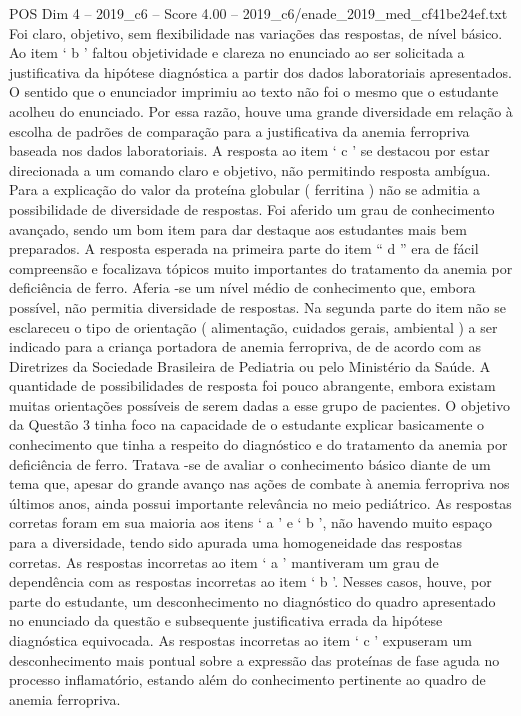 \begin{textsample}{POS Dim 4 – 2019\_c6 – Score 4.00 – 2019\_c6/enade\_2019\_med\_cf41be24ef.txt}
Foi claro, objetivo, sem flexibilidade nas variações das respostas, de nível básico.
Ao item ‘ b ’ faltou objetividade e clareza no enunciado ao ser solicitada a justificativa da hipótese diagnóstica a partir dos dados laboratoriais apresentados.
O sentido que o enunciador imprimiu ao texto não foi o mesmo que o estudante acolheu do enunciado.
Por essa razão, houve uma grande diversidade em relação à escolha de padrões de comparação para a justificativa da anemia ferropriva baseada nos dados laboratoriais.
A resposta ao item ‘ c ’ se destacou por estar direcionada a um comando claro e objetivo, não permitindo resposta ambígua.
Para a explicação do valor da proteína globular ( ferritina ) não se admitia a possibilidade de diversidade de respostas.
Foi aferido um grau de conhecimento avançado, sendo um bom item para dar destaque aos estudantes mais bem preparados.
A resposta esperada na primeira parte do item “ d ” era de fácil compreensão e focalizava tópicos muito importantes do tratamento da anemia por deficiência de ferro.
Aferia -se um nível médio de conhecimento que, embora possível, não permitia diversidade de respostas.
Na segunda parte do item não se esclareceu o tipo de orientação ( alimentação, cuidados gerais, ambiental ) a ser indicado para a criança portadora de anemia ferropriva, de de acordo com as Diretrizes da Sociedade Brasileira de Pediatria ou pelo Ministério da Saúde.
A quantidade de possibilidades de resposta foi pouco abrangente, embora existam muitas orientações possíveis de serem dadas a esse grupo de pacientes.
O objetivo da Questão 3 tinha foco na capacidade de o estudante explicar basicamente o conhecimento que tinha a respeito do diagnóstico e do tratamento da anemia por deficiência de ferro.
Tratava -se de avaliar o conhecimento básico diante de um tema que, apesar do grande avanço nas ações de combate à anemia ferropriva nos últimos anos, ainda possui importante relevância no meio pediátrico.
As respostas corretas foram em sua maioria aos itens ‘ a ’ e ‘ b ’, não havendo muito espaço para a diversidade, tendo sido apurada uma homogeneidade das respostas corretas.
As respostas incorretas ao item ‘ a ’ mantiveram um grau de dependência com as respostas incorretas ao item ‘ b ’.
Nesses casos, houve, por parte do estudante, um desconhecimento no diagnóstico do quadro apresentado no enunciado da questão e subsequente justificativa errada da hipótese diagnóstica equivocada.
As respostas incorretas ao item ‘ c ’ expuseram um desconhecimento mais pontual sobre a expressão das proteínas de fase aguda no processo inflamatório, estando além do conhecimento pertinente ao quadro de anemia ferropriva.

\end{textsample}
